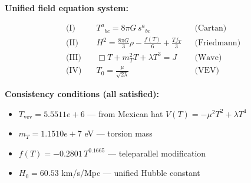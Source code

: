 
\textbf{Unified field equation system:}

\begin{align}
  \text{(I)} \quad & T^a{}_{bc} = 8\pi G \, s^a{}_{bc} && \text{(Cartan)} \\
  \text{(II)} \quad & H^2 = \frac{8\pi G}{3}\rho - \frac{f(T)}{6} + \frac{Tf_T}{3} && \text{(Friedmann)} \\
  \text{(III)} \quad & \Box T + m_T^2 T + \lambda T^3 = J && \text{(Wave)} \\
  \text{(IV)} \quad & T_0 = \frac{\mu}{\sqrt{2\lambda}} && \text{(VEV)}
\end{align}

\textbf{Consistency conditions (all satisfied):}
\begin{itemize}
  \item $T_{\text{vev}} = 5.5511e+6$ — from Mexican hat $V(T) = -\mu^2 T^2 + \lambda T^4$
  \item $m_T = 1.1510e+7$ eV — torsion mass
  \item $f(T) = -0.2801 \, T^{0.1665}$ — teleparallel modification
  \item $H_0 = 60.53$ km/s/Mpc — unified Hubble constant
\end{itemize}